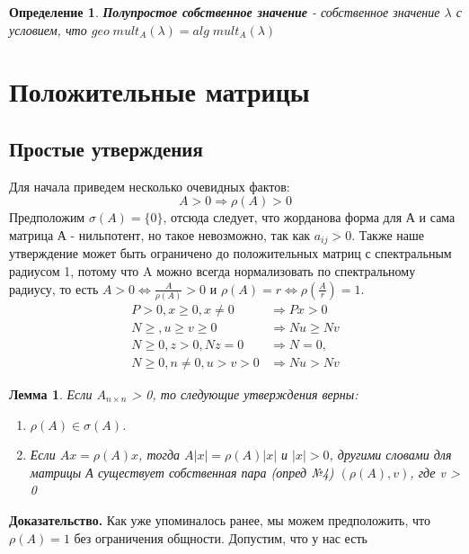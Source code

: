 \documentclass[a4paper,12pt,leqno]{article} %
\newtheorem{definition}{Определение}
\newtheorem{lemma}[theorem]{Лемма}
\begin{document}
\begin{definition}
    \textbf{Полупростое собственное значение} - собственное значение $\lambda$ с условием,
     что $geo \; mult_A(\lambda) = alg \; mult_A(\lambda)$
\end{definition}


\pagebreak

\section*{Положительные матрицы}
\subsection*{Простые утверждения}

Для начала приведем несколько очевидных фактов:
\begin{equation}
    A > 0 \Rightarrow \rho(A) > 0
\end{equation}
Предположим $\sigma(A) = \{0\}$, отсюда следует, что
жорданова форма для А и сама матрица А - нильпотент, но такое невозможно, так как $a_{ij} > 0$.
Также наше утверждение может быть ограничено до положительных матриц 
с спектральным радиусом 1, потому что A можно всегда нормализовать 
по спектральному радиусу, то есть $A > 0 \Leftrightarrow \frac{A}{\rho(A)} > 0 \text{ и } \rho(A) = 
r \Leftrightarrow \rho(\frac{A}{r}) = 1.$ 
\begin{align}
    P > 0 , x \geq 0, x \neq 0  &\Rightarrow Px > 0 \label{2} \\
    N \geq, u \geq v \geq 0  &\Rightarrow Nu \geq Nv \\
    N \geq 0, z > 0, Nz = 0  &\Rightarrow N =0, \\
    N \geq 0, n \neq 0, u > v > 0  &\Rightarrow Nu > Nv \label{5}
\end{align}
\begin{lemma}
    Если $A_{n \times n}$ > 0, то следующие утверждения верны:
    \begin{enumerate}
        \item $\rho(A) \in \sigma(A)$.
        \item Если $Ax=\rho(A)x$, тогда $A|x| = \rho(A)|x| $ и $|x| > 0$,
        другими словами для матрицы А существует собственная пара (опред №4)
        $(\rho(A), v)$, где v > 0
    \end{enumerate}
\end{lemma}
\noindent \textbf{Доказательство.} 
Как уже упоминалось ранее, мы можем предположить, 
что $\rho(A) = 1$ без ограничения общности.  Допустим, что у нас есть 
\end{document}
